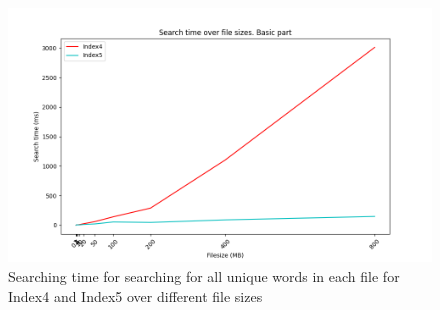 \begin{figure}[H]
    \centering
    \includegraphics[width=.8\textwidth]{LaTeX/Pictures/Results/BPSearch[4, 5].png}
    \caption{Searching time for searching for all unique words in each file for Index4 and Index5 over different file sizes}
    \label{fig:BPsearch45}
\end{figure} 




